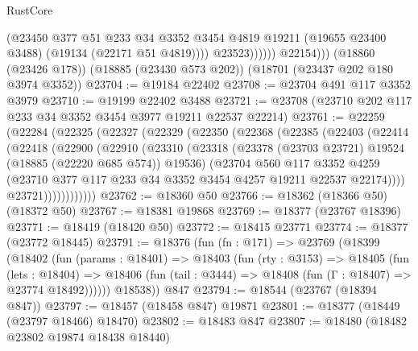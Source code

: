 \begin{lexlean}{RustCore}
\begin{coremodule}
                        (@23450
                          @377
                          @51
                          @233
                          @34
                          @3352
                          @3454
                          @4819
                          @19211
                          (@19655 @23400 @3488)
                          (@19134 (@22171 @51 @4819))))
                      @23523))))))
          @22154)))
    (@18860 (@23426 @178))
    (@18885 (@23430 @573 @202))
    (@18701 (@23437 @202 @180 @3974 @3352))
@23704 := @19184 @22402
@23708 := @23704 @491 @117 @3352 @3979
@23710 := @19199 @22402 @3488
@23721 := @23708 (@23710 @202 @117 @233 @34 @3352 @3454 @3977 @19211 @22537 @22214)
@23761 := @22259
    (@22284
      (@22325
        (@22327
          (@22329
            (@22350
              (@22368
                (@22385
                  (@22403
                    (@22414
                      (@22418
                        (@22900
                          (@22910
                            (@23310
                              (@23318
                                (@23378 (@23703 @23721) @19524 (@18885 (@22220 @685 @574)) @19536)
                                (@23704
                                  @560
                                  @117
                                  @3352
                                  @4259
                                  (@23710
                                    @377
                                    @117
                                    @233
                                    @34
                                    @3352
                                    @3454
                                    @4257
                                    @19211
                                    @22537
                                    @22174))))
                            @23721))))))))))))
@23762 := @18360 @50
@23766 := @18362 (@18366 @50) (@18372 @50)
@23767 := @18381 @19868
@23769 := @18377 (@23767 @18396)
@23771 := @18419 (@18420 @50)
@23772 := @18415 @23771
@23774 := @18377 (@23772 @18445)
@23791 := @18376
    (fun (fn : @171) =>
    @23769
      (@18399
        (@18402
          (fun (params : @18401) =>
          @18403
            (fun (rty : @3153) =>
            @18405
              (fun (lets : @18404) =>
              @18406 (fun (tail : @3444) => @18408 (fun (Γ : @18407) => @23774 @18492))))))
        @18538))
    @847
@23794 := @18544 (@23767 (@18394 @847))
@23797 := @18457 (@18458 @847) @19871
@23801 := @18377 (@18449 (@23797 @18466) @18470)
@23802 := @18483 @847
@23807 := @18480 (@18482 @23802 @19874 @18438 @18440)

\end{coremodule}
\end{lexlean}
